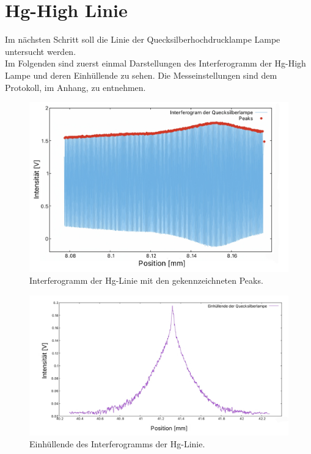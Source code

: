 \section{Hg-High Linie}
Im nächsten Schritt soll die Linie der Quecksilberhochdrucklampe Lampe untersucht werden. \\
Im Folgenden sind zuerst einmal Darstellungen des Interferogramm der Hg-High Lampe und 
deren Einhüllende zu sehen. Die Messeinstellungen sind dem Protokoll, im Anhang, zu entnehmen. \\
\begin{figure}[h]
    \centering
    \includegraphics[scale=0.2]{Bilder/Anna/Hg-High-Interferometer.jpg}
    \caption{Interferogramm der Hg-Linie mit den gekennzeichneten Peaks.}
    \label{fig:IHgHigh}
\end{figure}
\begin{figure}[h]
    \centering
    \includegraphics[scale=0.23]{Bilder/Anna/hg-high-ein.jpg}
    \caption{Einhüllende des Interferogramms der Hg-Linie.}
    \label{fig:EHgHigh}
\end{figure}\\
\newpage
